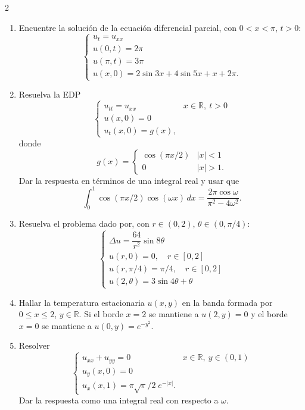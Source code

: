 \documentclass[11pt]{article}
\begin{document}
\columnseprule=0.5pt
\begin{multicols}{2}
\begin{enumerate}
\item Encuentre la solución de la ecuación diferencial parcial, con $0<x<\pi$, $t>0$:
\[
\begin{cases}
u_t = u_{xx} \\
u(0,t) = 2\pi \\
u(\pi,t) = 3\pi \\
u(x,0) = 2\sin 3x + 4\sin 5x + x + 2\pi.
\end{cases}
\]

\item Resuelva la EDP
\[
\begin{cases}
u_{tt} = u_{xx} & x\in\mathbb{R},\ t>0 \\
u(x,0) = 0 \\
u_t(x,0) = g(x),
\end{cases}
\]
donde
\[
g(x) = \begin{cases} \cos(\pi x/2) & |x|<1 \\ 0 & |x|>1. \end{cases}
\]
Dar la respuesta en términos de una integral real y usar que
\[
\int_0^1 \cos(\pi x/2)\cos(\omega x)\,dx = \frac{2\pi\cos\omega}{\pi^2 - 4\omega^2}.
\]

\item Resuelva el problema dado por, con $r\in(0,2)$, $\theta\in(0,\pi/4)$:
\[
\begin{cases}
\Delta u = \dfrac{64}{r^2}\sin 8\theta \\
u(r,0) = 0, \quad r\in[0,2] \\
u(r,\pi/4) = \pi/4, \quad r\in[0,2] \\
u(2,\theta) = 3\sin 4\theta + \theta
\end{cases}
\]

\item Hallar la temperatura estacionaria $u(x,y)$ en la banda formada por $0\le x\le 2$, $y\in\mathbb{R}$. Si el borde $x=2$ se mantiene a $u(2,y)=0$ y el borde $x=0$ se mantiene a $u(0,y) = e^{-y^2}$.

\item Resolver
\[
\begin{cases}
u_{xx}+u_{yy}=0 & x\in\mathbb{R},\ y\in(0,1) \\
u_y(x,0) = 0 \\
u_x(x,1) = \pi\sqrt{\pi}/2\; e^{-|x|}.
\end{cases}
\]
Dar la respuesta como una integral real con respecto a $\omega$.


\end{enumerate}
\end{multicols}
\end{document}
